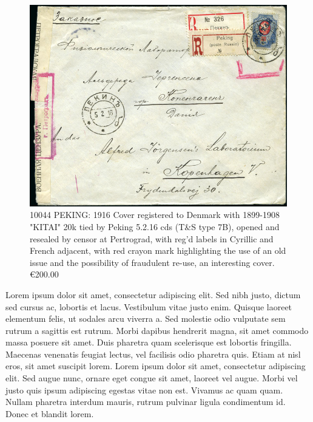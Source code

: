 \begin{figure}[htbp]
\centering
\includegraphics[width=.95\textwidth]{../russian-post-offices-in-china/10044.jpg}
\caption{
10044	PEKING: 1916 Cover registered to Denmark with 1899-1908 "KITAI" 
20k tied by Peking 5.2.16 cds (T\&S type 7B), opened and resealed by censor 
at Pertrograd, with reg'd labels in Cyrillic and French adjacent, with 
red crayon mark highlighting the use of an old issue and the possibility of 
fraudulent re-use, an interesting cover.
\euro 200.00 
}  
\end{figure}   


Lorem ipsum dolor sit amet, consectetur adipiscing elit. Sed nibh justo, dictum sed cursus ac, lobortis et lacus. Vestibulum vitae justo enim. Quisque laoreet elementum felis, ut sodales arcu viverra a. Sed molestie odio vulputate sem rutrum a sagittis est rutrum. Morbi dapibus hendrerit magna, sit amet commodo massa posuere sit amet. Duis pharetra quam scelerisque est lobortis fringilla. Maecenas venenatis feugiat lectus, vel facilisis odio pharetra quis. Etiam at nisl eros, sit amet suscipit lorem. Lorem ipsum dolor sit amet, consectetur adipiscing elit. Sed augue nunc, ornare eget congue sit amet, laoreet vel augue. Morbi vel justo quis ipsum adipiscing egestas vitae non est. Vivamus ac quam quam. Nullam pharetra
                                                    interdum mauris, rutrum pulvinar ligula condimentum id. Donec et blandit lorem. 

\clearpage

